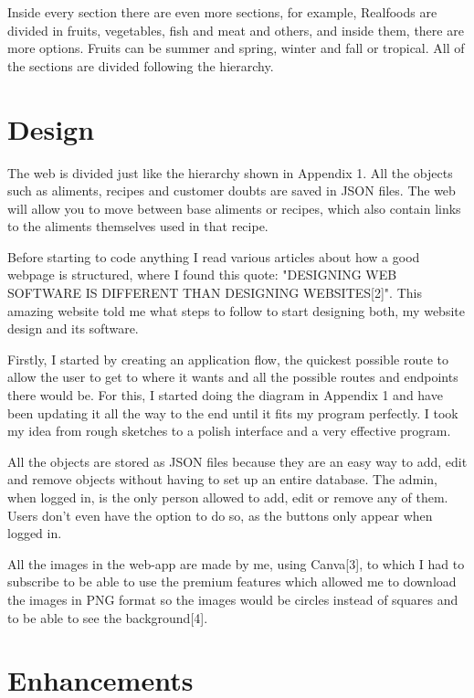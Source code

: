 \documentclass[10pt, a4paper]{article}
\begin{document}
    Inside every section there are even more sections, for example, Realfoods are divided in fruits, vegetables, fish and meat and others, and inside them, there are more options. Fruits can be summer and spring, winter and fall or tropical. All of the sections are divided following the hierarchy.

    \section{Design}

    The web is divided just like the hierarchy shown in Appendix 1. All the objects such as aliments, recipes and customer doubts are saved in JSON files. The web will allow you to move between base aliments or recipes, which also contain links to the aliments themselves used in that recipe.

    Before starting to code anything I read various articles about how a good webpage is structured, where I found this quote: "DESIGNING WEB SOFTWARE IS DIFFERENT THAN DESIGNING WEBSITES[2]". This amazing website told me what steps to follow to start designing both, my website design and its software.

    Firstly, I started by creating an application flow, the quickest possible route to allow the user to get to where it wants and all the possible routes and endpoints there would be. For this, I started doing the diagram in Appendix 1 and have been updating it all the way to the end until it fits my program perfectly. I took my idea from rough sketches to a polish interface and a very effective program.

    All the objects are stored as JSON files because they are an easy way to add, edit and remove objects without having to set up an entire database. The admin, when logged in, is the only person allowed to add, edit or remove any of them. Users don't even have the option to do so, as the buttons only appear when logged in.

    All the images in the web-app are made by me, using Canva[3], to which I had to subscribe to be able to use the premium features which allowed me to download the images in PNG format so the images would be circles instead of squares and to be able to see the background[4].

    \section{Enhancements}
\end{document}

